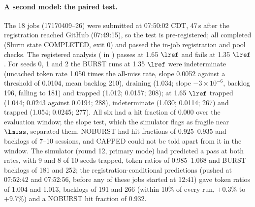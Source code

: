 \paragraph{A second model: the paired test.} The 18 jobs (17170409--26) were submitted at 07:50:02 CDT, 47\,s after the registration reached GitHub (07:49:15), so the test is pre-registered; all completed (Slurm state COMPLETED, exit 0) and passed the in-job registration and pool checks. The registered analysis ( in ) passes at 1.65 $\lref$ and fails at 1.35 $\lref$. For seeds 0, 1 and 2 the BURST runs at 1.35 $\lref$ were indeterminate (uncached token rate 1.050 times the all-miss rate, slope 0.0052\sps{} against a threshold of 0.0104, mean backlog 210), draining (1.034; slope $-3\times10^{-6}$, backlog 196, falling to 181) and trapped (1.012; 0.0157; 208); at 1.65 $\lref$ trapped (1.044; 0.0243 against 0.0194; 288), indeterminate (1.030; 0.0114; 267) and trapped (1.054; 0.0245; 277). All six had a hit fraction of 0.000 over the evaluation window; the slope test, which the simulator flags as fragile near $\lmiss$, separated them. NOBURST had hit fractions of 0.925--0.935 and backlogs of 7--10 sessions, and CAPPED could not be told apart from it in the window. The simulator (round 12, primary mode) had predicted a pass at both rates, with 9 and 8 of 10 seeds trapped, token ratios of 0.985--1.068 and BURST backlogs of 181 and 252; the registration-conditional predictions (pushed at 07:52:42 and 07:52:56, before any of these jobs started at 12:41) gave token ratios of 1.004 and 1.013, backlogs of 191 and 266 (within 10\% of every run, $+0.3\%$ to $+9.7\%$) and a NOBURST hit fraction of 0.932.

